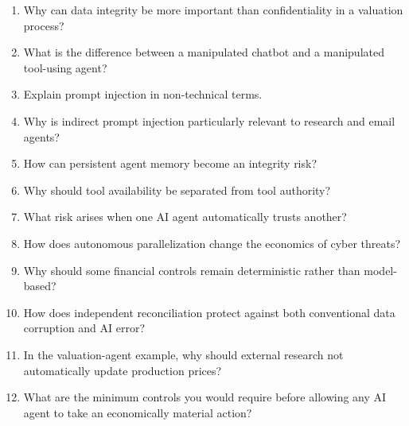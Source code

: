 \begin{enumerate}
    \item Why can data integrity be more important than confidentiality in a valuation process?
    \item What is the difference between a manipulated chatbot and a manipulated tool-using agent?
    \item Explain prompt injection in non-technical terms.
    \item Why is indirect prompt injection particularly relevant to research and email agents?
    \item How can persistent agent memory become an integrity risk?
    \item Why should tool availability be separated from tool authority?
    \item What risk arises when one AI agent automatically trusts another?
    \item How does autonomous parallelization change the economics of cyber threats?
    \item Why should some financial controls remain deterministic rather than model-based?
    \item How does independent reconciliation protect against both conventional data corruption and AI error?
    \item In the valuation-agent example, why should external research not automatically update production prices?
    \item What are the minimum controls you would require before allowing any AI agent to take an economically material action?
\end{enumerate}

